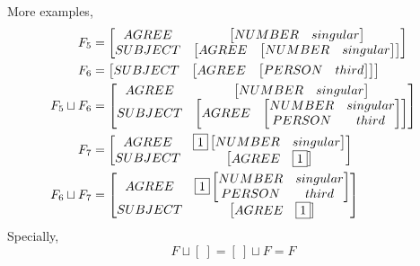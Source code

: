 \documentclass{article}
\begin{document}
\begin{CJK}{UTF8}{gbsn}
More examples,
\begin{align*}
F_5 &= 
\begin{bmatrix}
AGREE & 
\begin{bmatrix}
NUMBER & singular
\end{bmatrix} \\
SUBJECT & 
\begin{bmatrix}
AGREE &
\begin{bmatrix}
NUMBER & singular
\end{bmatrix}
\end{bmatrix}
\end{bmatrix}\\
F_6 &=
\begin{bmatrix}
SUBJECT &
\begin{bmatrix}
AGREE &
\begin{bmatrix}
PERSON & third
\end{bmatrix}
\end{bmatrix}
\end{bmatrix}\\
F_5 \sqcup F_6 &=
\begin{bmatrix}
AGREE & 
\begin{bmatrix}
NUMBER & singular
\end{bmatrix} \\
SUBJECT &
\begin{bmatrix}
AGREE &
\begin{bmatrix}
NUMBER & singular \\
PERSON & third
\end{bmatrix}
\end{bmatrix}
\end{bmatrix}\\
F_7 &= 
\begin{bmatrix}
AGREE & \fbox{1}
\begin{bmatrix}
NUMBER & singular
\end{bmatrix} \\
SUBJECT &
\begin{bmatrix}
AGREE & \fbox{1}
\end{bmatrix}
\end{bmatrix} \\
F_6 \sqcup F_7 &=
\begin{bmatrix}
AGREE & \fbox{1}
\begin{bmatrix}
NUMBER & singular \\
PERSON & third
\end{bmatrix} \\
SUBJECT & 
\begin{bmatrix}
AGREE & \fbox{1}
\end{bmatrix}
\end{bmatrix}
\end{align*}
Specially,
\[
F \sqcup [\ ]=[\ ] \sqcup F=F
\]


\end{CJK}
\end{document}
